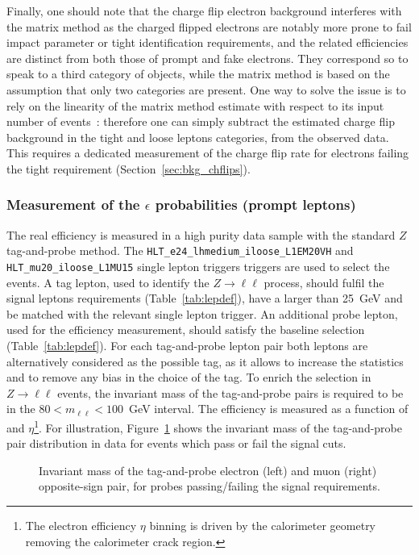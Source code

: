 Finally, one should note that the charge flip electron background interferes with the matrix method 
as the charged flipped electrons are notably more prone to fail impact parameter or tight identification requirements, 
and the related efficiencies are distinct from both those of prompt and fake electrons. 
They correspond so to speak to a third category of objects, while the matrix method is based on the assumption that only two categories are present. One way to solve the issue is to rely on the linearity of the matrix method estimate with respect to its input number of events~: therefore one can simply subtract the estimated charge flip background in the tight and loose leptons categories, from the observed data. 
This requires a dedicated measurement of the charge flip rate for electrons failing the tight requirement (Section~\ref{sec:bkg_chflips}). 



\subsubsection{Measurement of the $\epsilon$ probabilities (prompt leptons)}
\label{sec:RealRate_DD}
The real efficiency is measured in a high purity data sample with the standard $Z$ tag-and-probe method. The \texttt{HLT\_e24\_lhmedium\_iloose\_L1EM20VH} and \texttt{HLT\_mu20\_iloose\_L1MU15} single lepton triggers triggers are used to select the events. A tag lepton, used to identify the $Z\to \ell\ell$ process, should fulfil the signal leptons requirements (Table~\ref{tab:lepdef}), have a \pt larger than 25~GeV and be matched with the relevant single lepton trigger. An additional probe lepton, used for the efficiency measurement, should satisfy the baseline selection (Table~\ref{tab:lepdef}). For each tag-and-probe lepton pair both leptons are alternatively considered as the possible tag, as it allows to increase the statistics and to remove any bias in the choice of the tag. To enrich the selection in $Z\to \ell\ell$ events, the invariant mass of the tag-and-probe pairs is required to be in the $80 < m_{\ell\ell} < 100$~GeV interval. The efficiency is measured as a function of \pt and $\eta$\footnote{The electron efficiency $\eta$ binning is driven by the calorimeter geometry removing the calorimeter crack region.}. For illustration, Figure~\ref{Fig:InvMass_realEff} shows the invariant mass of the tag-and-probe pair distribution in data for events which pass or fail the signal cuts.        

\begin{figure}[h!]
\centering
{}
\caption{Invariant mass of the tag-and-probe electron (left) and muon (right) opposite-sign pair, for probes passing/failing the signal requirements. }
\label{Fig:InvMass_realEff}
\end{figure}

